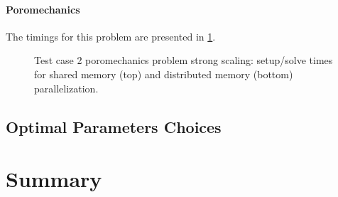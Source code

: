 \paragraph{Poromechanics}
The timings for this problem are presented in \cref{fig:mazumodel2_scaling_strong_poro}.

\begin{figure} [htbp]
  \begin{subfigure}[t]{0.48\textwidth}
    \centering
    
  \end{subfigure}
  \hfill
  \begin{subfigure}[t]{0.48\textwidth}
  \hspace{\textwidth}
  \end{subfigure}
  \begin{subfigure}[t]{0.48\textwidth}
    \centering
    
  \end{subfigure}
  \hfill
  \begin{subfigure}[t]{0.48\textwidth}
    \centering
    
  \end{subfigure}
  \caption[Test case 2 poromechanics problem strong scaling]{Test case 2 poromechanics problem strong scaling: setup/solve times for shared memory (top) and distributed memory (bottom) parallelization.}
  \label{fig:mazumodel2_scaling_strong_poro}
\end{figure}


\subsection{Optimal Parameters Choices}

\section{Summary}
\label{sec:par_summary}